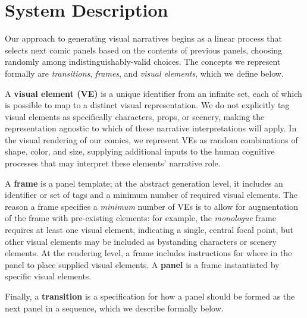 \section{System Description}

Our approach to generating visual narratives begins as a linear
process that selects next comic panels based on the contents of previous
panels, choosing randomly among indistinguishably-valid choices.
The concepts we represent formally are {\em transitions}, {\em frames}, and
{\em visual elements}, which we define below.


A {\bf visual element (VE)} is a unique identifier from an infinite set,
each of which is possible to map to a distinct visual representation.
We do not explicitly tag visual elements as specifically characters, props,
or scenery, making the representation agnostic to which of these narrative
interpretations will apply. In the visual rendering of our comics, we
represent VEs as random combinations of shape, color, and size, supplying
additional inputs to the human cognitive processes that may interpret these
elements' narrative role.

A {\bf frame} is a panel template; at the abstract generation level, it
includes an identifier or set of tags and a minimum number of required
visual elements. The reason a frame specifies a {\em minimum} number of VEs
is to allow for augmentation of the frame with pre-existing elements: for
example, the {\em monologue} frame requires at least one visual element,
indicating a single, central focal point, but other visual elements may be
included as bystanding characters or scenery elements.
At the rendering level, a frame includes instructions for where in the
panel to place supplied visual elements.
A {\bf panel} is a frame instantiated by specific visual elements.


Finally, a {\bf transition} is a specification for how a panel should be
formed as the next panel in a sequence, which we describe formally below.

